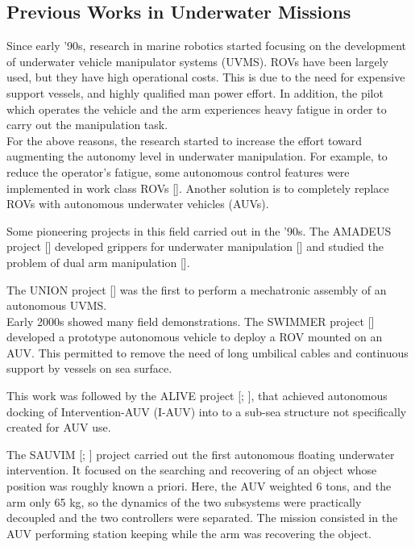 \subsection{Previous Works in Underwater Missions}
Since early '90s, research in marine robotics started focusing on the development of underwater vehicle manipulator systems (UVMS). ROVs have been largely used, but they have high operational costs. This is due to the need for expensive support vessels, and highly qualified man power effort. In addition, the pilot which operates the vehicle and the arm experiences heavy fatigue in order to carry out the manipulation task.\\


For the above reasons, the research started to increase the effort toward augmenting the autonomy level in underwater manipulation. For example, to reduce the operator’s fatigue, some autonomous control features were implemented in work class ROVs [\cite{IntroTeleopRov}]. Another solution is to completely replace ROVs with autonomous underwater vehicles (AUVs).

Some pioneering projects in this field carried out in the '90s. The AMADEUS project [\cite{IntroAMADEUS1}] developed grippers for underwater manipulation [\cite{IntroAMADEUS2}] and studied the problem of dual arm manipulation [\cite{IntroAMADEUS3}].

The UNION project [\cite{IntroUNION}] was the first to perform a mechatronic assembly of an autonomous UVMS.\\


Early 2000s showed many field demonstrations. The SWIMMER project [\cite{IntroSwimmer1}] developed a prototype autonomous vehicle to deploy a ROV mounted on an AUV. This permitted to remove the need of long umbilical cables and continuous support by vessels on sea surface.

This work was followed by the ALIVE project [\cite{IntroAlive1}; \cite{IntroAlive2}], that achieved autonomous docking of Intervention-AUV (I-AUV) into to a sub-sea structure not specifically created for AUV use.

The SAUVIM [\cite{IntroSauvim1}; \cite{IntroSauvim2}] project carried out the first autonomous floating underwater intervention. It focused on the searching and recovering of an object whose position was roughly known a priori. Here, the AUV weighted 6 tons, and the arm only 65 kg, so the dynamics of the two subsystems were practically decoupled and the two controllers were separated. The mission consisted in the AUV performing station keeping while the arm was recovering the object.


